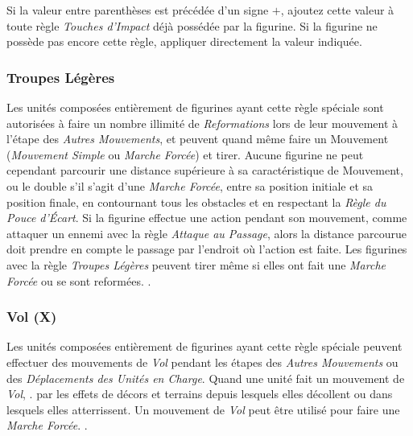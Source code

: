 Si la valeur entre parenthèses est précédée d'un signe $+$, ajoutez cette valeur à toute règle \emph{Touches d'Impact} déjà possédée par la figurine. Si la figurine ne possède pas encore cette règle, appliquer directement la valeur indiquée.


\subsubsection*{Troupes Légères}

Les unités composées entièrement de figurines ayant cette règle spéciale sont autorisées à faire un nombre illimité de \emph{Reformations} lors de leur mouvement à l'étape des \emph{Autres Mouvements}, et peuvent quand même faire un Mouvement (\emph{Mouvement Simple} ou \emph{Marche Forcée}) et tirer. Aucune figurine ne peut cependant parcourir une distance supérieure à sa caractéristique de Mouvement, ou le double s'il s'agit d'une \emph{Marche Forcée}, entre sa position initiale et sa position finale, en contournant tous les obstacles et en respectant la \emph{Règle du Pouce d'Écart}. Si la figurine effectue une action pendant son mouvement, comme attaquer un ennemi avec la règle \emph{Attaque au Passage}, alors la distance parcourue doit prendre en compte le passage par l'endroit où l'action est faite. Les figurines avec la règle \emph{Troupes Légères} peuvent tirer même si elles ont fait une \emph{Marche Forcée} ou se sont reformées. .

\subsubsection*{Vol (X)}

Les unités composées entièrement de figurines ayant cette règle spéciale peuvent effectuer des mouvements de \emph{Vol} pendant les étapes des \emph{Autres Mouvements} ou des \emph{Déplacements des Unités en Charge}. Quand une unité fait un mouvement de \emph{Vol}, .  par les effets de décors et terrains depuis lesquels elles décollent ou dans lesquels elles atterrissent. Un mouvement de \emph{Vol} peut être utilisé pour faire une \emph{Marche Forcée}. .

